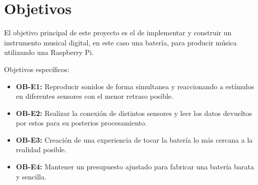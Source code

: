 
\chapter{Objetivos} %
\label{cha:Objetivos}

    El objetivo principal de este proyecto es el de implementar y construir un instrumento musical digital, en este caso
    una batería, para producir música utilizando una Raspberry Pi.

    Objetivos específicos:
    \begin{itemize}
        \item \textbf{OB-E1:} Reproducir sonidos de forma simultanea y reaccionando a estímulos en diferentes sensores
        con el menor retraso posible.
        \item \textbf{OB-E2:} Realizar la conexión de distintos sensores y leer los datos devueltos por estos para su
        posterios procesamiento.
        \item \textbf{OB-E3:} Creación de una experiencia de tocar la batería lo más cercana a la realidad posible.
        \item \textbf{OB-E4:} Mantener un presupuesto ajustado para fabricar una batería barata y sencilla.
    \end{itemize}


\newpage
